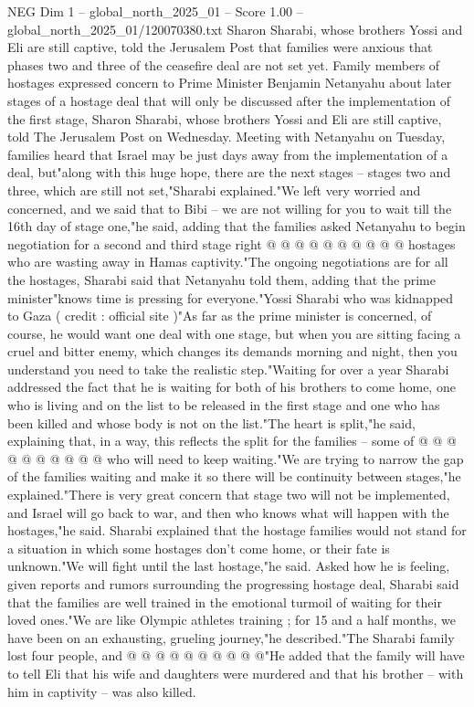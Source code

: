 \begin{textsample}{NEG Dim 1 – global\_north\_2025\_01 – Score 1.00 – global\_north\_2025\_01/120070380.txt}  \label{ex:f1_neg_088}
Sharon Sharabi, whose brothers Yossi and Eli are still captive, told the Jerusalem Post that families were anxious that phases two and three of the ceasefire deal are not set yet.
Family members of hostages expressed concern to Prime Minister Benjamin Netanyahu about later stages of a hostage deal that will only be discussed after the implementation of the first stage, Sharon Sharabi, whose brothers Yossi and Eli are still captive, told The Jerusalem Post on Wednesday.
Meeting with Netanyahu on Tuesday, families heard that Israel may be just days away from the implementation of a deal, but"along with this huge hope, there are the next stages -- stages two and three, which are still not set,"Sharabi explained."We left very worried and concerned, and we said that to Bibi -- we are not willing for you to wait till the 16th day of stage one,"he said, adding that the families asked Netanyahu to begin negotiation for a second and third stage right @ @ @ @ @ @ @ @ @ @ hostages who are wasting away in Hamas captivity."The ongoing negotiations are for all the hostages, Sharabi said that Netanyahu told them, adding that the prime minister"knows time is pressing for everyone."Yossi Sharabi who was kidnapped to Gaza ( credit : official site )"As far as the prime minister is concerned, of course, he would want one deal with one stage, but when you are sitting facing a cruel and bitter enemy, which changes its demands morning and night, then you understand you need to take the realistic step."Waiting for over a year Sharabi addressed the fact that he is waiting for both of his brothers to come home, one who is living and on the list to be released in the first stage and one who has been killed and whose body is not on the list."The heart is split,"he said, explaining that, in a way, this reflects the split for the families -- some of @ @ @ @ @ @ @ @ @ @ who will need to keep waiting."We are trying to narrow the gap of the families waiting and make it so there will be continuity between stages,"he explained."There is very great concern that stage two will not be implemented, and Israel will go back to war, and then who knows what will happen with the hostages,"he said.
Sharabi explained that the hostage families would not stand for a situation in which some hostages don't come home, or their fate is unknown."We will fight until the last hostage,"he said.
Asked how he is feeling, given reports and rumors surrounding the progressing hostage deal, Sharabi said that the families are well trained in the emotional turmoil of waiting for their loved ones."We are like Olympic athletes training ; for 15 and a half months, we have been on an exhausting, grueling journey,"he described."The Sharabi family lost four people, and @ @ @ @ @ @ @ @ @ @"He added that the family will have to tell Eli that his wife and daughters were murdered and that his brother -- with him in captivity -- was also killed.

\end{textsample}
